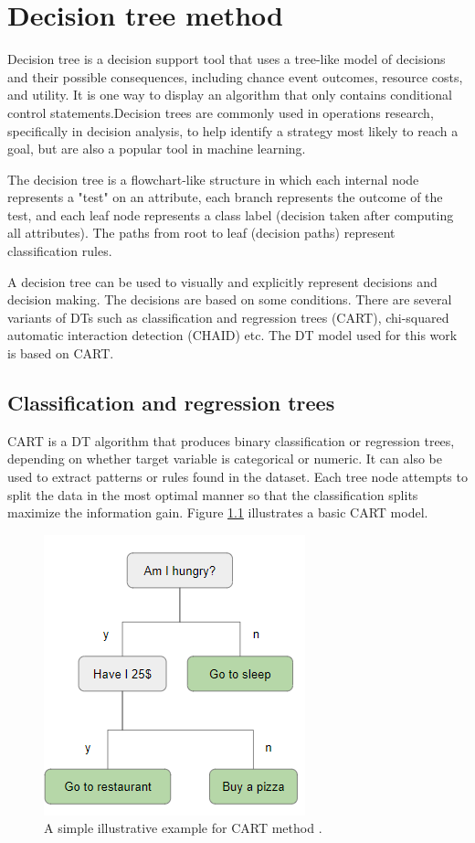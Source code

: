 \chapter{Decision tree method}
Decision tree is a decision support tool that uses a tree-like model of decisions and their possible consequences, including chance event outcomes, resource costs, and utility. It is one way to display an algorithm that only contains conditional control statements.Decision trees are commonly used in operations research, specifically in decision analysis, to help identify a strategy most likely to reach a goal, but are also a popular tool in machine learning.

The decision tree is a flowchart-like structure in which each internal node represents a "test" on an attribute, each branch represents the outcome of the test, and each leaf node represents a class label (decision taken after computing all attributes). The paths from root to leaf (decision paths) represent classification rules.

A decision tree can be used to visually and explicitly represent decisions and decision making. The decisions are based on some conditions. There are several variants of DTs such as classification and regression trees (CART), chi-squared automatic interaction detection (CHAID) etc. The DT model used for this work is based on CART. 

\section{Classification and regression trees}
CART is a DT algorithm that produces binary classification or regression trees, depending on whether target variable is categorical or numeric. It can also be used to extract patterns or rules found in the dataset. Each tree node attempts to split the data in the most optimal manner so that the classification splits maximize the information gain. Figure \ref{fig:cart_illustration} illustrates a basic CART model.

\begin{figure}
    \centering
    \includegraphics[scale=0.5]{chapters/images/cart_basic_example.png}
    \caption{A simple illustrative example for CART method \cite{edureka_decision_2018}.}
    \label{fig:cart_illustration}
\end{figure}

